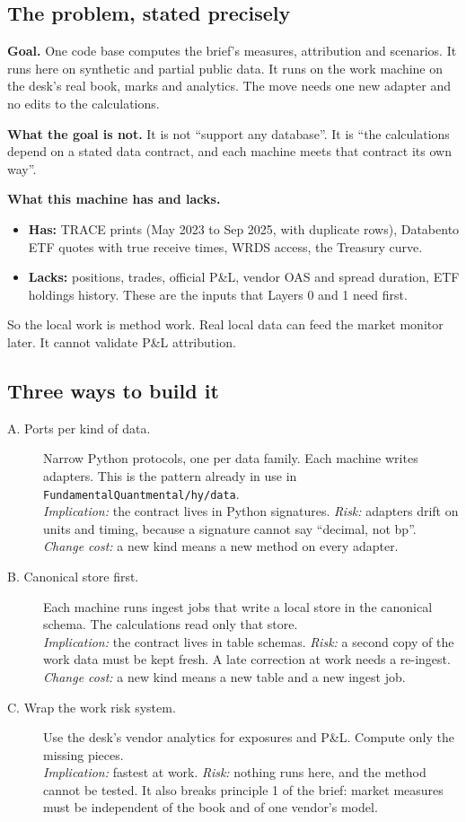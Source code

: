 \documentclass[11pt,a4paper]{article}
\newcommand{\code}[1]{\texttt{\small #1}}
\begin{document}
\subsection{The problem, stated precisely}
\textbf{Goal.} One code base computes the brief's measures, attribution and scenarios. It runs here on synthetic and partial public data. It runs on the work machine on the desk's real book, marks and analytics. The move needs one new adapter and no edits to the calculations.

\textbf{What the goal is not.} It is not ``support any database''. It is ``the calculations depend on a stated data contract, and each machine meets that contract its own way''.

\textbf{What this machine has and lacks.}
\begin{itemize}
\item \textbf{Has:} TRACE prints (May 2023 to Sep 2025, with duplicate rows), Databento ETF quotes with true receive times, WRDS access, the Treasury curve.
\item \textbf{Lacks:} positions, trades, official P\&L, vendor OAS and spread duration, ETF holdings history. These are the inputs that Layers 0 and 1 need first.
\end{itemize}
So the local work is method work. Real local data can feed the market monitor later. It cannot validate P\&L attribution.

\subsection{Three ways to build it}
\begin{description}
\item[A. Ports per kind of data.] Narrow Python protocols, one per data family. Each machine writes adapters. This is the pattern already in use in \code{FundamentalQuantmental/hy/data}.\\
\emph{Implication:} the contract lives in Python signatures. \emph{Risk:} adapters drift on units and timing, because a signature cannot say ``decimal, not bp''. \emph{Change cost:} a new kind means a new method on every adapter.
\item[B. Canonical store first.] Each machine runs ingest jobs that write a local store in the canonical schema. The calculations read only that store.\\
\emph{Implication:} the contract lives in table schemas. \emph{Risk:} a second copy of the work data must be kept fresh. A late correction at work needs a re-ingest. \emph{Change cost:} a new kind means a new table and a new ingest job.
\item[C. Wrap the work risk system.] Use the desk's vendor analytics for exposures and P\&L. Compute only the missing pieces.\\
\emph{Implication:} fastest at work. \emph{Risk:} nothing runs here, and the method cannot be tested. It also breaks principle 1 of the brief: market measures must be independent of the book and of one vendor's model.
\end{description}
\end{document}

